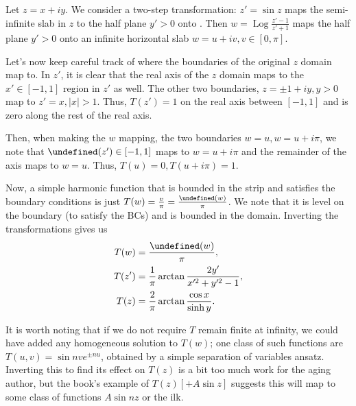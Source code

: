 \documentclass[12pt]{report}
\newcommand{\abs}[1]{\left|#1\right|}
\let\Re\undefined
\let\Im\undefined
\DeclareMathOperator{\Re}{Re}
\DeclareMathOperator{\Im}{Im}
\DeclareMathOperator{\Log}{Log}
\begin{document}
Let $z = x + iy$. We consider a two-step transformation: $z' = \sin z$ maps the
semi-infinite slab in $z$ to the half plane $y' > 0$ onto . Then $w = \Log
\frac{z' - 1}{z' + 1}$ maps the half plane $y' > 0$ onto an infinite horizontal
slab $w = u + iv, v \in [0, \pi]$.

Let's now keep careful track of where the boundaries of the original $z$ domain
map to. In $z'$, it is clear that the real axis of the $z$ domain maps to the
$x' \in [-1, 1]$ region in $z'$ as well. The other two boundaries, $z = \pm 1 +
iy, y > 0$ map to $z' = x, \abs{x} > 1$. Thus, $T(z') = 1$ on the real axis
between $[-1, 1]$ and is zero along the rest of the real axis.

Then, when making the $w$ mapping, the two boundaries $w = u, w = u + i\pi$, we
note that $\Re(z') \in [-1, 1]$ maps to $w = u + i\pi$ and the remainder of the
axis maps to $w = u$. Thus, $T(u) = 0, T(u + i\pi) = 1$.

Now, a simple harmonic function that is bounded in the strip and satisfies the
boundary conditions is just $T(w) = \frac{v}{\pi} = \frac{\Im(w)}{\pi}$. We note
that it is level on the boundary (to satisfy the BCs) and is bounded in the
domain. Inverting the transformations gives us
\begin{align}
    T(w) &= \frac{\Im(w)}{\pi},\\
    T(z') &= \frac{1}{\pi}\arctan \frac{2y'}{x'^2 + y'^2 - 1},\\
    T(z) &= \frac{2}{\pi} \arctan \frac{\cos x}{\sinh y}.
\end{align}

It is worth noting that if we do not require $T$ remain finite at infinity, we
could have added any homogeneous solution to $T(w)$; one class of such functions
are $T(u, v) = \sin nv e^{\pm nu}$, obtained by a simple separation of variables
ansatz. Inverting this to find its effect on $T(z)$ is a bit too much work for
the aging author, but the book's example of $T(z) [ + A\sin z]$ suggests this
will map to some class of functions $A \sin nz$ or the ilk.
\end{document}
